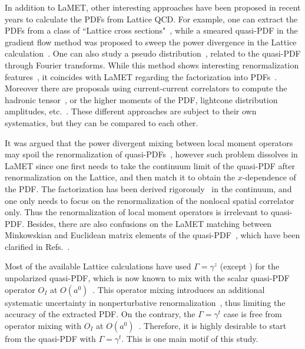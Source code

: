 In addition to LaMET,
other interesting  approaches have   been proposed in recent years to calculate the PDFs from Lattice QCD. For example, one can extract the PDFs from a  class of ``Lattice cross sections"~\cite{Ma:2014jla,Ma:2017pxb}, while a smeared quasi-PDF in the gradient flow method was proposed to sweep  the power divergence in the Lattice calculation~\cite{Monahan:2016bvm,Monahan:2017hpu}.
One can also study a pseudo distribution~\cite{Radyushkin:2017cyf}, related to the quasi-PDF through Fourier transforms. While this method shows  interesting renormalization features~\cite{Orginos:2017kos,Karpie:2017bzm}, it  coincides  with  LaMET regarding the factorization
into PDFs~\cite{Ji:2017rah,Zhang:2018ggy,Izubuchi:2018srq}. Moreover  there are proposals using current-current correlators
to compute the hadronic tensor~\cite{Liu:1993cv,Liang:2017mye}, or the higher moments of the PDF, lightcone distribution amplitudes, etc.~\cite{Detmold:2005gg,Braun:2007wv,Liang:2017mye,Chambers:2017dov,Bali:2018spj,Bali:2019ecy}. These different approaches are subject to their own systematics, but they can be compared to each other.



It was argued  that the power divergent mixing between   local moment operators may spoil the renormalization of quasi-PDFs~\cite{Rossi:2017muf,Rossi:2018zkn}, however such problem dissolves in LaMET since  one  first needs to take  the continuum limit of the quasi-PDF after renormalization on the Lattice, and then match it to obtain the $x$-dependence of the PDF.  The factorization has been derived rigorously~\cite{Ma:2014jla,Izubuchi:2018srq} in the continuum, and one only needs to  focus on the renormalization of the nonlocal spatial correlator only.   Thus the renormalization of   local moment operators is irrelevant to quasi-PDF. Besides, there are also confusions on the LaMET matching between Minkowskian and Euclidean matrix elements of the quasi-PDF~\cite{Carlson:2017gpk}, which have been clarified in Refs.~\cite{Ji:2017rah,Briceno:2017cpo}.


Most of the available  Lattice calculations  have used  $\Gamma=\gamma^z$ (except \cite{Chen:2018xof,Alexandrou:2018pbm}) for the unpolarized quasi-PDF,  which is now known to mix with the scalar quasi-PDF operator  $O_{I}$ at $O(a^0)$~\cite{Constantinou:2017sej,Chen:2017mie,Green:2017xeu}.   This  operator mixing introduces an additional systematic uncertainty in   nonperturbative renormalization~\cite{Alexandrou:2017huk,Chen:2017mzz,Green:2017xeu,Lin:2017ani}, thus limiting the accuracy of the extracted PDF. On the contrary, the $\Gamma=\gamma^t$ case is free from operator mixing with $O_{I}$ at $O(a^0)$~\cite{Constantinou:2017sej,Chen:2017mie,Green:2017xeu}. Therefore, it is highly desirable to start from the quasi-PDF with $\Gamma=\gamma^t$.  This is one main motif of this study.


